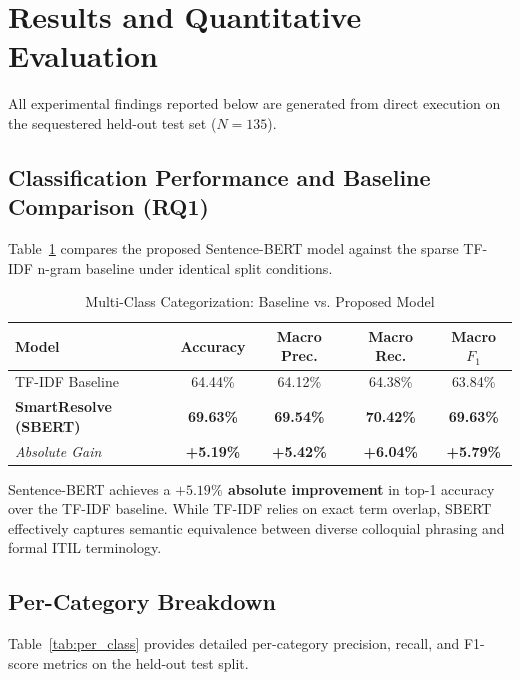 \documentclass[conference]{IEEEtran}
\begin{document}
\section{Results and Quantitative Evaluation}

All experimental findings reported below are generated from direct execution on the sequestered held-out test set ($N=135$).

\subsection{Classification Performance and Baseline Comparison (RQ1)}
Table~\ref{tab:comp} compares the proposed Sentence-BERT model against the sparse TF-IDF n-gram baseline under identical split conditions.

\begin{table}[h]
\centering
\caption{Multi-Class Categorization: Baseline vs. Proposed Model}
\label{tab:comp}
\begin{tabular}{lcccc}
\toprule
\textbf{Model} & \textbf{Accuracy} & \textbf{Macro Prec.} & \textbf{Macro Rec.} & \textbf{Macro $F_1$} \\
\midrule
TF-IDF Baseline & 64.44\% & 64.12\% & 64.38\% & 63.84\% \\
\textbf{SmartResolve (SBERT)} & \textbf{69.63\%} & \textbf{69.54\%} & \textbf{70.42\%} & \textbf{69.63\%} \\
\midrule
\textit{Absolute Gain} & \textbf{+5.19\%} & \textbf{+5.42\%} & \textbf{+6.04\%} & \textbf{+5.79\%} \\
\bottomrule
\end{tabular}
\end{table}

Sentence-BERT achieves a \textbf{$+5.19\%$ absolute improvement} in top-1 accuracy over the TF-IDF baseline. While TF-IDF relies on exact term overlap, SBERT effectively captures semantic equivalence between diverse colloquial phrasing and formal ITIL terminology.

\subsection{Per-Category Breakdown}
Table~\ref{tab:per_class} provides detailed per-category precision, recall, and F1-score metrics on the held-out test split.
\end{document}
